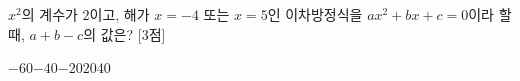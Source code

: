 $x^2$의 계수가 $2$이고, 해가 $x=-4$ 또는 $x=5$인 이차방정식을 $ax^2+bx+c=0$이라 할 때, $a+b-c$의 값은?  \mbox{[3점]}
\begin{choices32}{$-60$}{$-40$}{$-20$}{$20$}{$40$}\end{choices32}
